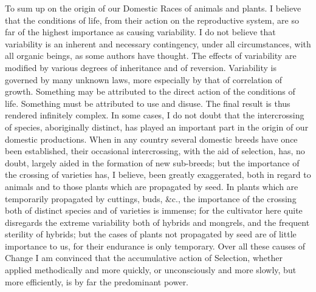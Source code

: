 \indent To sum up on the origin of our Domestic Races of animals and plants. I believe that the conditions of life, from their action on the reproductive system, are so far of the highest importance as causing variability. I do not believe that variability is an inherent and necessary contingency, under all circumstances, with all organic beings, as some authors have thought. The effects of variability are modified by various degrees of inheritance and of reversion. Variability is governed by many unknown laws, more especially by that of correlation of growth.  Something may be attributed to the direct action of the conditions of life. Something must be attributed to use and disuse. The final result is thus rendered infinitely complex. In some cases, I do not doubt that the intercrossing of species, aboriginally distinct, has played an important part in the origin of our domestic productions.  When in any country several domestic breeds have once been established, their occasional intercrossing, with the aid of selection, has, no doubt, largely aided in the formation of new sub-breeds; but the importance of the crossing of varieties has, I believe, been greatly exaggerated, both in regard to animals and to those plants which are propagated by seed. In plants which are temporarily propagated by cuttings, buds, \&c., the importance of the crossing both of distinct species and of varieties is immense; for the cultivator here quite disregards the extreme variability both of hybrids and mongrels, and the frequent sterility of hybrids; but the cases of plants not propagated by seed are of little importance to us, for their endurance is only temporary. Over all these causes of Change I am convinced that the accumulative action of Selection, whether applied methodically and more quickly, or unconsciously and more slowly, but more efficiently, is by far the predominant power.